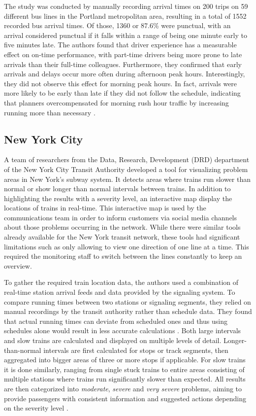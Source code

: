 The study was conducted by manually recording arrival times on 200 trips on 59 different bus lines in the Portland metropolitan area, resulting in a total of 1552 recorded bus arrival times. Of those, 1360 or 87.6\% were punctual, with an arrival considered punctual if it falls within a range of being one minute early to five minutes late. The authors found that driver experience has a measurable effect on on-time performance, with part-time drivers being more prone to late arrivals than their full-time colleagues. Furthermore, they confirmed that early arrivals and delays occur more often during afternoon peak hours. Interestingly, they did not observe this effect for morning peak hours. In fact, arrivals were more likely to be early than late if they did not follow the schedule, indicating that planners overcompensated for morning rush hour traffic by increasing running more than necessary \autocite[97--99]{strathman-1993}.

\subsection{New York City}

A team of researchers from the Data, Research, Development (DRD) department of the New York City Transit Authority developed a tool for visualizing problem areas in New York's subway system. It detects areas where trains run slower than normal or show longer than normal intervals between trains. In addition to highlighting the results with a severity level, an interactive map display the locations of trains in real-time. This interactive map is used by the communications team in order to inform customers via social media channels about those problems occurring in the network. While there were similar tools already available for the New York transit network, these tools had significant limitations such as only allowing to view one direction of one line at a time. This required the monitoring staff to switch between the lines constantly to keep an overview. \autocite[1--3]{caspari-2021}

To gather the required train location data, the authors used a combination of real-time station arrival feeds and data provided by the signaling system. To compare running times between two stations or signaling segments, they relied on manual recordings by the transit authority rather than schedule data. They found that actual running times can deviate from scheduled ones and thus using schedules alone would result in less accurate calculations \autocite[4]{caspari-2021}. Both large intervals and slow trains are calculated and displayed on multiple levels of detail. Longer-than-normal intervals are first calculated for stops or track segments, then aggregated into bigger areas of three or more stops if applicable. For slow trains it is done similarly, ranging from single stuck trains to entire areas consisting of multiple stations where trains run significantly slower than expected. All results are then categorized into \textit{moderate}, \textit{severe} and \textit{very severe} problems, aiming to provide passengers with consistent information and suggested actions depending on the severity level \autocite[6--7]{caspari-2021}.

